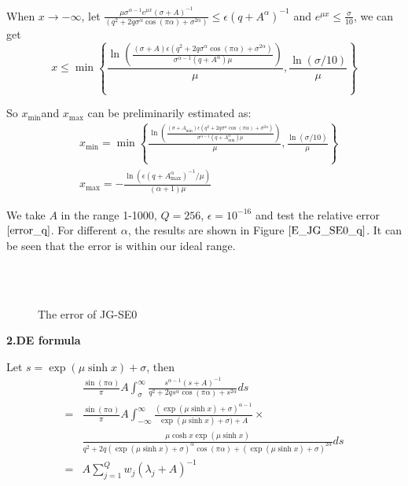 When $x\rightarrow -\infty$, let $\frac{\mu \sigma^{\alpha-1}e^{\mu x}(\sigma+A)^{-1}}{(q^2+2q\sigma^{\alpha}\cos(\pi\alpha)+\sigma^{2\alpha})}\leq \epsilon (q+A^{\alpha})^{-1}$ and $e^{\mu x}\le \frac{\sigma}{10}$, we can get
\begin{equation}
	x\leq \min \left\{\frac{\ln\left(\frac{(\sigma+A)\epsilon(q^2+2q\sigma^{\alpha}\cos(\pi\alpha)+\sigma^{2\alpha})}{\sigma^{\alpha-1}(q+A^{\alpha})\mu}\right)}{\mu},\frac{\ln(\sigma/10)}{\mu}\right\}
\end{equation}

So  $x_{\min}$and $x_{\max}$ can be preliminarily estimated as:
\begin{equation}
	\begin{aligned}
		&x_{\min}= \min \left\{\frac{\ln\left(\frac{(\sigma+A_{\min})\epsilon(q^2+2q\sigma^{\alpha}\cos(\pi\alpha)+\sigma^{2\alpha})}{\sigma^{\alpha-1}(q+A_{\min}^{\alpha})\mu}\right)}{\mu},\frac{\ln(\sigma/10)}{\mu}\right\}\\
		&x_{\max}=-\frac{\ln(\epsilon (q+A_{\max}^{\alpha})^{-1}/\mu)}{(\alpha+1)\mu}
	\end{aligned}
\label{findminmax_SE0_q}
\end{equation}

We take $A$ in the range 1-1000, $Q=256$,  $\epsilon=10^{-16}$ and test the relative error $\eqref{error_q}$. For different $\alpha $, the results are shown in Figure $\ref{E_JG_SE0_q}$. It can be seen that the error is within our ideal range.

\begin{figure}[htbp]
	\centering
	~~
	~~
	\\
	~~
	~~
	\caption{The error of JG-SE0}
	\label{E_JG_SE0_q}
\end{figure}

\textbf{ 2.DE formula}

Let $s=\exp(\mu\sinh x)+\sigma$, then
\begin{equation}
	\begin{aligned}
		&\frac{\sin(\pi\alpha)}{\pi}A\int_{\sigma}^{\infty}\frac{s^{\alpha-1}(s+{A})^{-1}}{q^2+2qs^{\alpha}\cos(\pi\alpha)+s^{2\alpha}}ds\\
		=&\frac{\sin(\pi\alpha)}{\pi}A\int_{-\infty}^{\infty}\frac{(\exp(\mu \sinh x)+\sigma)^{\alpha-1}}{\exp(\mu \sinh x)+\sigma)+{A}}\times\\
		&	\frac{\mu \cosh x\exp(\mu \sinh x)}{q^2+2q(\exp(\mu \sinh x)+\sigma)^{\alpha}\cos(\pi\alpha)+(\exp(\mu \sinh x)+\sigma)^{2\alpha}} ds\\
		= & A\sum_{j=1}^{Q}w_j(\lambda_j+A)^{-1}
	\end{aligned}
\end{equation}

